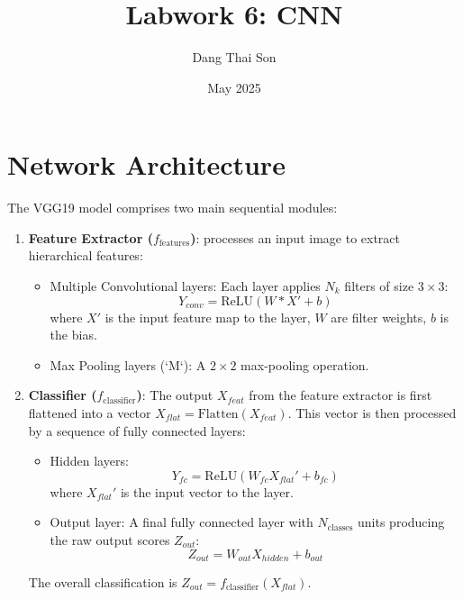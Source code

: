 \documentclass{article}
\title{Labwork 6: CNN}
\author{Dang Thai Son}
\date{May 2025}
\begin{document}
\maketitle

\section{Network Architecture}

The VGG19 model comprises two main sequential modules:

\begin{enumerate}
    \item \textbf{Feature Extractor ($f_{\text{features}}$)}:
    processes an input image to extract hierarchical features:
    \begin{itemize}
        \item Multiple Convolutional layers: Each layer applies $N_k$ filters of size $3 \times 3$:
        \[ Y_{conv} = \text{ReLU}(W * X' + b) \]
        where $X'$ is the input feature map to the layer, $W$ are filter weights, $b$ is the bias.
        \item Max Pooling layers (`M`): A $2 \times 2$ max-pooling operation.
    \end{itemize}

    \item \textbf{Classifier ($f_{\text{classifier}}$)}:
    The output $X_{feat}$ from the feature extractor is first flattened into a vector $X_{flat} = \text{Flatten}(X_{feat})$. This vector is then processed by a sequence of fully connected layers:
    \begin{itemize}
        \item Hidden layers:
        \[ Y_{fc} = \text{ReLU}(W_{fc} X_{flat}' + b_{fc}) \]
        where $X_{flat}'$ is the input vector to the layer.
        \item Output layer: A final fully connected layer with $N_{\text{classes}}$ units producing the raw output scores $Z_{out}$:
        \[ Z_{out} = W_{out} X_{hidden} + b_{out} \]
    \end{itemize}
    The overall classification is $Z_{out} = f_{\text{classifier}}(X_{flat})$.
\end{enumerate}
\end{document}
